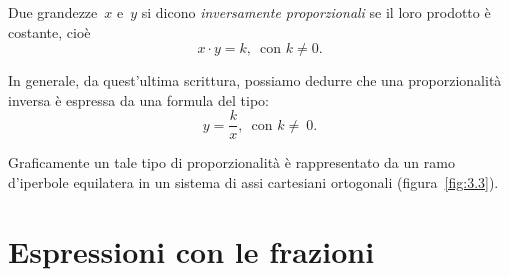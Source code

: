 \begin{definizione}
  Due grandezze~$x$ e~$y$ si dicono \emph{inversamente proporzionali} se il loro prodotto è costante,
cioè
\[x\cdot y=k\text{,~~con }k\neq 0.\]
\end{definizione}

In generale, da quest'ultima scrittura, possiamo dedurre che una proporzionalità inversa è
espressa da una formula del tipo:
\[y=\frac{k}{x}\text{,~~con }k\neq~0.\]

Graficamente un tale tipo di proporzionalità è rappresentato da un ramo d'iperbole
equilatera in un sistema di assi cartesiani ortogonali (figura~\ref{fig:3.3}).

\vspazio\ovalbox{\risolvii \ref{ese:3.126}, \ref{ese:3.127}, \ref{ese:3.128}, \ref{ese:3.129}}


\section{Espressioni con le frazioni}
